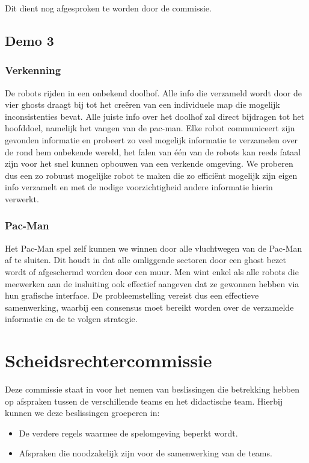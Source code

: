 \documentclass[12pt,a4paper]{report}
\begin{document}
Dit dient nog afgesproken te worden door de commissie.

\section{Demo 3}

\subsection{Verkenning}

De robots rijden in een onbekend doolhof. Alle info die verzameld wordt door de vier ghosts draagt bij tot het cre\"eren van een individuele map die mogelijk inconsistenties bevat. Alle juiste info over het doolhof zal direct bijdragen tot het hoofddoel, namelijk het vangen van de pac-man. Elke robot communiceert zijn gevonden informatie en probeert zo veel mogelijk informatie te verzamelen over de rond hem onbekende wereld, het falen van \'e\'en van de robots kan reeds fataal zijn voor het snel kunnen opbouwen van een verkende omgeving. We proberen dus een zo robuust mogelijke robot te maken die zo effici\"ent mogelijk zijn eigen info verzamelt en met de nodige voorzichtigheid andere informatie hierin verwerkt.

\subsection{Pac-Man}

Het Pac-Man spel zelf kunnen we winnen door alle vluchtwegen van de Pac-Man af te sluiten. Dit houdt in dat alle omliggende sectoren door een ghost bezet wordt of afgeschermd worden door een muur. Men wint enkel als alle robots die meewerken aan de insluiting ook effectief aangeven dat ze gewonnen hebben via hun grafische interface. De probleemstelling vereist dus een effectieve samenwerking, waarbij een consensus moet bereikt worden over de verzamelde informatie en de te volgen strategie.

\chapter{Scheidsrechtercommissie}

Deze commissie staat in voor het nemen van beslissingen die betrekking hebben op afspraken tussen de verschillende teams en het didactische team. Hierbij kunnen we deze beslissingen groeperen in:
\begin{itemize}
	\item De verdere regels waarmee de spelomgeving beperkt wordt.
	\item Afspraken die noodzakelijk zijn voor de samenwerking van de teams.
\end{itemize}
\end{document}
